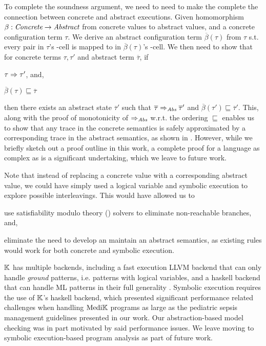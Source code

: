 To complete the soundness argument, we need to need to make the complete the connection
between concrete and abstract executions. Given homomorphism $\beta: \textit{Concrete} \to \textit{Abstract}$
from concrete values to abstract values, and a concrete configuration term
$\tau$. We derive an abstract configuration term $\overline{\beta}\left(\tau\right)$ from $\tau$ s.t.
every  pair in $\tau$'s
-cell is mapped to 
in $\overline{\beta}\left(\tau\right)$'s -cell.
We then need to show that for
concrete terms $\tau, \tau'$ and abstract term $\overline{\tau}$, if
\begin{enumerate*}[label=(\alph*)]
  \item $\tau \Rightarrow \tau'$, and,
  \item $\overline{\beta}\left(\tau\right) \sqsubseteq \overline{\tau}$
\end{enumerate*}
then there exists an abstract state $\overline{\tau}'$ such that
$\overline{\tau} \Rightarrow_{\textit{Abs}} \overline{\tau}'$ and $\overline{\beta}\left(\tau'\right) \sqsubseteq \overline{\tau}'$.
This, along with the proof of monotonicity of $\Rightarrow_{\textit{Abs}}$ w.r.t. the ordering
$\sqsubseteq$ enables us to show that any trace in the concrete semantics is safely approximated
by a corresponding trace in the abstract semantics, as shown in
\cite{SchmidtLISP98}. However, while we briefly sketch out a proof outline
in this work, a complete proof for a language as complex as \MediK{} is a
significant undertaking, which we leave to future work.

Note that instead of replacing a concrete value with a corresponding abstract value,
we could have simply used a logical variable and symbolic execution to explore
possible interleavings. This would have allowed us to
\begin{enumerate*}
  \item use satisfiability modulo theory (\SMT{}) solvers to eliminate
  non-reachable branches, and,
  \item eliminate the need to develop an maintain an abstract semantics, as
  existing rules would work for both concrete and symbolic execution.
\end{enumerate*}

$\mathbb{K}$ has multiple backends, including a fast execution LLVM backend
that can only handle \emph{ground} patterns, i.e. patterns with logical
variables, and a haskell backend that can handle ML patterns in their
full generality \cite{KFrameworkBackendsUrl}. Symbolic execution requires the use of $\mathbb{K}$'s haskell
backend, which presented significant performance related challenges when
handling $\text{Medi}\mathbb{K}{}{}$ programs as large as the pediatric sepsis management
guidelines presented in our work. Our abstraction-based model checking was in part motivated by
said performance issues. We leave moving to symbolic execution-based
program analysis as part of future work.


